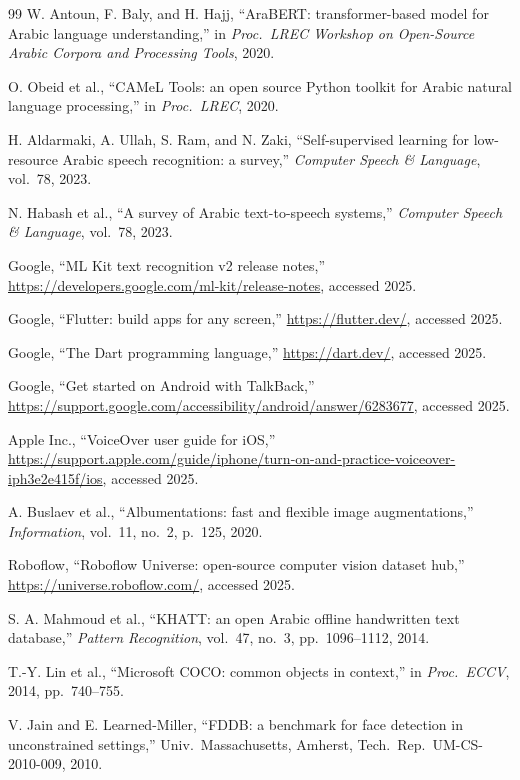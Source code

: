 \documentclass[11pt,a4paper]{article}
\begin{document}
\begin{thebibliography}{99}
W. Antoun, F. Baly, and H. Hajj, ``AraBERT: transformer-based model for
Arabic language understanding,'' in \emph{Proc.\ LREC Workshop on Open-Source Arabic Corpora and Processing Tools}, 2020.

O. Obeid et al., ``CAMeL Tools: an open source Python toolkit for
Arabic natural language processing,'' in \emph{Proc.\ LREC}, 2020.

H. Aldarmaki, A. Ullah, S. Ram, and N. Zaki, ``Self-supervised learning
for low-resource Arabic speech recognition: a survey,''
\emph{Computer Speech \& Language}, vol.\ 78, 2023.

N. Habash et al., ``A survey of Arabic text-to-speech systems,''
\emph{Computer Speech \& Language}, vol.\ 78, 2023.

Google, ``ML Kit text recognition v2 release notes,''
\url{https://developers.google.com/ml-kit/release-notes}, accessed
2025.

Google, ``Flutter: build apps for any screen,''
\url{https://flutter.dev/}, accessed 2025.

Google, ``The Dart programming language,''
\url{https://dart.dev/}, accessed 2025.

Google, ``Get started on Android with TalkBack,''
\url{https://support.google.com/accessibility/android/answer/6283677},
accessed 2025.

Apple Inc., ``VoiceOver user guide for iOS,''
\url{https://support.apple.com/guide/iphone/turn-on-and-practice-voiceover-iph3e2e415f/ios},
accessed 2025.

A. Buslaev et al., ``Albumentations: fast and flexible image
augmentations,'' \emph{Information}, vol.\ 11, no.\ 2, p.\ 125, 2020.

Roboflow, ``Roboflow Universe: open-source computer vision dataset
hub,'' \url{https://universe.roboflow.com/}, accessed 2025.

S. A. Mahmoud et al., ``KHATT: an open Arabic offline handwritten text
database,'' \emph{Pattern Recognition}, vol.\ 47, no.\ 3, pp.\
1096--1112, 2014.

T.-Y. Lin et al., ``Microsoft COCO: common objects in context,'' in
\emph{Proc.\ ECCV}, 2014, pp.\ 740--755.

V. Jain and E. Learned-Miller, ``FDDB: a benchmark for face detection
in unconstrained settings,'' Univ.\ Massachusetts, Amherst, Tech.\ Rep.\
UM-CS-2010-009, 2010.


\end{thebibliography}
\end{document}
